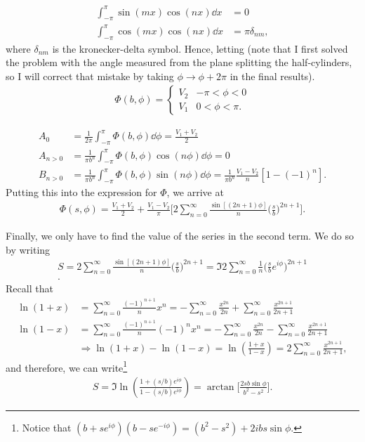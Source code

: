 {\begin{align}
    \int_{-\pi}^{\pi} \sin(mx)\cos(nx) \dd{x} &= 0 \\
    \int_{-\pi}^{\pi} \cos(mx)\cos(nx) \dd{x} &= \pi \delta_{nm}
,\end{align}
where $\delta_{nm}$ is the kronecker-delta symbol.
Hence, letting (note that I first solved the problem with the angle measured from the plane splitting the half-cylinders, so I will correct that mistake by taking $\phi \rightarrow \phi + 2\pi$ in the final results).
\begin{eqnarray}
   \Phi(b,\phi) = \begin{cases}
       V_2 & -\pi < \phi < 0 \\
       V_1 & 0 < \phi < \pi
   .\end{cases}
\end{eqnarray}

\begin{align}
    A_0 &= \frac{1}{2\pi} \int_{-\pi}^{\pi} \Phi(b,\phi) \dd{\phi} = \frac{V_1 + V_2}{2} \\
    A_{n>0} &= \frac{1}{\pi b^{n}} \int_{-\pi}^{\pi} \Phi(b,\phi) \cos(n\phi) \dd{\phi} = 0 \\
    B_{n>0} &= \frac{1}{\pi b^{n}} \int_{-\pi}^{\pi} \Phi(b,\phi) \sin(n\phi) \dd{\phi} = \frac{1}{\pi b^{n}} \frac{V_1 - V_2}{n} [1 - (-1)^{n}]
.\end{align}
Putting this into the expression for $\Phi$, we arrive at
\begin{eqnarray}
    \Phi(s,\phi) = \frac{V_1 + V_2}{2} + \frac{V_1 - V_2}{\pi} \Bigg[ 2 \sum_{n=0}^{\infty} \frac{\sin[(2n+1)\phi]}{n} \Big( \frac{s}{b} \Big)^{2n+1} \Bigg]
.\end{eqnarray}

Finally, we only have to find the value of the series in the second term.
We do so by writing
\begin{eqnarray}
    S = 2\sum_{n=0}^{\infty} \frac{\sin[(2n+1) \phi]}{n} \Big( \frac{s}{b} \Big)^{2n+1} = \Im{ 2\sum_{n=0}^{\infty} \frac{1}{n} \Big( \frac{s}{b} e^{i\phi} \Big)^{2n+1} } \\
.\end{eqnarray}
Recall that
\begin{align}
    \ln(1 + x) &= \sum_{n=0}^{\infty} \frac{(-1)^{n+1}}{n} x^{n} = -\sum_{n=0}^{\infty} \frac{x^{2n}}{2n} + \sum_{n=0}^{\infty} \frac{x^{2n+1}}{2n+1} \\
    \ln(1 - x) &= \sum_{n=0}^{\infty} \frac{(-1)^{n+1}}{n} (-1)^{n} x^{n} = -\sum_{n=0}^{\infty} \frac{x^{2n}}{2n} - \sum_{n=0}^{\infty} \frac{x^{2n+1}}{2n+1} \\
    &\Rightarrow \ln(1 + x) - \ln(1 - x) =\ln( \frac{1 + x}{1-x} ) = 2 \sum_{n=0}^{\infty} \frac{x^{2n+1}}{2n + 1}
,\end{align}
and therefore, we can write\footnote{Notice that $(b+s e^{i\phi})(b - s e^{-i\phi}) = (b^2 - s^2) + 2i b s \sin{\phi}$.}
\begin{eqnarray}
    S = \Im{ \ln( \frac{1 + (s/b)e^{i\phi}}{1 - (s/b)e^{i\phi}} ) } = \arctan\Bigg[ \frac{2 s b \sin{\phi}}{b^2 - s^2} \Bigg]
.\end{eqnarray}

}
